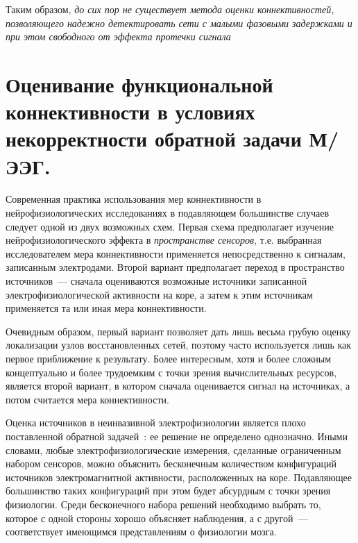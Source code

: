Таким образом, \emph{до сих пор не существует метода оценки коннективностей,
позволяющего надежно детектировать сети с малыми фазовыми задержками и при этом свободного
от эффекта протечки сигнала}


\section{Оценивание функциональной коннективности в условиях некорректности обратной задачи М/ЭЭГ.}\label{sec:connectivity_and_ill_posedness}

Современная практика использования мер коннективности в нейрофизиологических
исследованиях в подавляющем большинстве случаев следует одной из двух возможных схем.
Первая схема предполагает изучение нейрофизиологического эффекта  в \emph{пространстве сенсоров},
т.е. выбранная исследователем мера коннективности применяется непосредственно к сигналам,
записанным электродами.
Второй вариант предполагает переход в пространство источников~--- сначала оцениваются
возможные источники записанной электрофизиологической активности на коре, а затем к этим
источникам применяется та или иная  мера коннективности.

Очевидным образом, первый вариант позволяет дать лишь весьма грубую оценку локализации
узлов восстановленных сетей, поэтому часто используется лишь как первое приближение к результату.
Более интересным, хотя и более сложным концептуально и более
трудоемким с точки зрения вычислительных ресурсов, является второй вариант, в котором
сначала оценивается сигнал на источниках, а потом считается мера коннективности.

Оценка источников в неинвазивной электрофизиологии является
плохо поставленной обратной задачей~\cite{Hamalainen1993}:
ее решение не определено однозначно. Иными словами, любые электрофизиологические измерения,
сделанные ограниченным набором сенсоров, можно объяснить бесконечным количеством конфигураций
источников электромагнитной активности, расположенных на коре. Подавляющее большинство таких конфигураций
при этом будет абсурдным с точки зрения физиологии. Среди бесконечного набора
решений необходимо выбрать то, которое с одной стороны хорошо объясняет наблюдения, а с другой~---
соответствует имеющимся представлениям о физиологии мозга.

